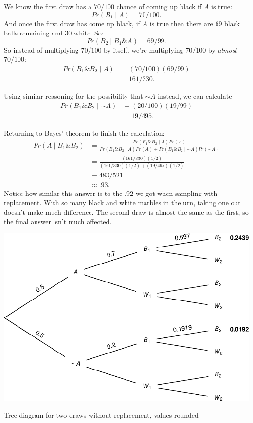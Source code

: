 \documentclass[justified]{tufte-book}
\newcommand{\given}{\mid}
\renewcommand{\neg}{\mathbin{\sim}}
\renewcommand{\wedge}{\mathbin{\&}}
\newcommand{\p}{Pr}
\theoremstyle{definition}
\theoremstyle{definition}
\theoremstyle{definition}
\theoremstyle{definition}
\theoremstyle{remark}
\begin{document}
We know the first draw has a \(70/100\) chance of coming up black if \(A\) is true:
\[ \p(B_1 \given A) = 70/100. \]
And once the first draw has come up black, if \(A\) is true then there are 69 black balls remaining and 30 white. So:
\[ \p(B_2 \given B_1 \wedge A) = 69/99. \]
So instead of multiplying \(70/100\) by itself, we're multiplying \(70/100\) by \emph{almost} \(70/100\):
\[
  \begin{aligned}
    \p(B_1 \wedge B_2 \given A) &= (70/100)(69/99)\\
       &= 161/330.
  \end{aligned}
\]

Using similar reasoning for the possibility that \(\neg A\) instead, we can calculate
\[
  \begin{aligned}
    \p(B_1 \wedge B_2 \given \neg A) &= (20/100)(19/99)\\
       &= 19/495.
  \end{aligned}
\]

Returning to Bayes' theorem to finish the calculation:
\[
  \begin{aligned}
    \p(A \given B_1 \wedge B_2) &= \frac{\p(B_1 \wedge B_2 \given A)\p(A)}{\p(B_1 \wedge B_2 \given A) \p(A) + \p(B_1 \wedge B_2 \given \neg A) \p(\neg A)} \\
      &= \frac{(161/330)(1/2)}{(161/330)(1/2) + (19/495)(1/2)} \\
      &= 483/521 \\
      &\approx .93. 
  \end{aligned}
\]
Notice how similar this answer is to the \(.92\) we got when sampling with replacement. With so many black and white marbles in the urn, taking one out doesn't make much difference. The second draw is almost the same as the first, so the final answer isn't much affected.

\begin{marginfigure}
\includegraphics{_main_files/figure-latex/twodrawsnoreplacement-1} \caption[Tree diagram for two draws without replacement, values rounded]{Tree diagram for two draws without replacement, values rounded}\label{fig:twodrawsnoreplacement}
\end{marginfigure}
\end{document}
